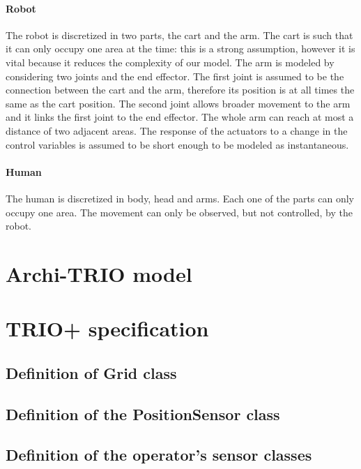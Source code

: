 \documentclass[a4paper]{article}
\begin{document}
\paragraph{Robot}
The robot is discretized in two parts, the cart and the arm. The cart is such that it can only occupy one area at the time: this is a strong assumption, however it is vital because it reduces the complexity of our model. The arm is modeled by considering two joints and the end effector. The first joint is assumed to be the connection between the cart and the arm, therefore its position is at all times the same as the cart position. The second joint allows broader movement to the arm and it links the first joint to the end effector. The whole arm can reach at most a distance of two adjacent areas. The response of the actuators to a change in the control variables is assumed to be short enough to be modeled as instantaneous.

\paragraph{Human}
The human is discretized in body, head and arms. Each one of the parts can only occupy one area. The movement can only be observed, but not controlled, by the robot.

\clearpage
\section{Archi-TRIO model}




\clearpage
\section{TRIO+ specification}

\subsection{Definition of Grid class}


\pagebreak
\subsection{Definition of the PositionSensor class}


\pagebreak
\subsection{Definition of the operator's sensor classes}


\pagebreak


\end{document}
